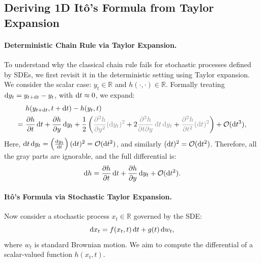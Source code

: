 \subsection{Deriving 1D It\^o's Formula from Taylor Expansion}\label{subsec:1D-Ito}

\paragraph{Deterministic Chain Rule via Taylor Expansion.}
To understand why the classical chain rule fails for stochastic processes defined by SDEs, we first revisit it in the deterministic setting using Taylor expansion. We consider the scalar case: $y_t \in \mathbb{R}$ and $h(\cdot,\cdot)\in \mathbb{R}$. Formally treating $\mathop{}\!\mathrm{d} y_t = y_{t+\mathop{}\!\mathrm{d} t} - y_t$, with $\mathop{}\!\mathrm{d} t \approx 0$, we expand:
\begin{align*}
&h(y_{t+\diff t}, t+\diff t) 
- h(y_t, t) \\
= ~&\frac{\partial h}{\partial t} \diff t
+ \frac{\partial h}{\partial y} \diff y_t  + \frac{1}{2} \left(\textcolor{gray}{\frac{\partial^2 h}{\partial y^2}  (\diff y_t)^2}
+ 2 \textcolor{gray}{\frac{\partial^2 h}{\partial t \partial y} \diff t \diff y_t}
+  \textcolor{gray}{\frac{\partial^2 h}{\partial t^2} (\diff t)^2}
\right)
+ \mathcal{O}(\diff t^3),
\end{align*}
Here, $\mathop{}\!\mathrm{d} t \mathop{}\!\mathrm{d} y_t = \left(\frac{\mathop{}\!\mathrm{d} y_t}{\mathop{}\!\mathrm{d} t}\right)(\mathop{}\!\mathrm{d} t)^2 = \mathcal{O}(\mathop{}\!\mathrm{d} t^2)$, and similarly $(\mathop{}\!\mathrm{d} t)^2 = \mathcal{O}(\mathop{}\!\mathrm{d} t^2)$. Therefore, all the gray parts are ignorable, and the full differential is:
\[
\mathop{}\!\mathrm{d} h
= \frac{\partial h}{\partial t} \mathop{}\!\mathrm{d} t
+ \frac{\partial h}{\partial y} \mathop{}\!\mathrm{d} y_t
+ \mathcal{O}(\mathop{}\!\mathrm{d} t^2).
\]

\paragraph{It\^o's Formula via Stochastic Taylor Expansion.}
Now consider a stochastic process $x_t \in \mathbb{R}$ governed by the SDE:
\[
\mathop{}\!\mathrm{d} x_t = f(x_t, t) \mathop{}\!\mathrm{d} t + g(t) \mathop{}\!\mathrm{d} w_t,
\]
where $w_t$ is standard Brownian motion. We aim to compute the differential of a scalar-valued function $h(x_t, t)$.

